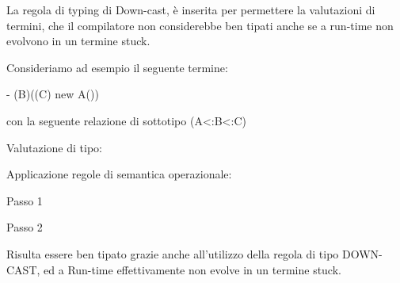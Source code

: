 La regola di typing di Down-cast, \`e inserita per permettere la valutazioni di termini, che il compilatore non considerebbe ben tipati anche se a run-time non evolvono in un termine stuck.

\vspace{0,5cm}
Consideriamo ad esempio il seguente termine: 

	- (B)((C) new A())
	
	con la seguente relazione di sottotipo (A<:B<:C)

\vspace{0,5cm}	
Valutazione di tipo:

\vspace{0,3cm}
\begin{prooftree}
	\end{prooftree}
	
\vspace{1cm}	
Applicazione regole di semantica operazionale:

\vspace{0,3cm}
Passo 1
\begin{prooftree}
	\end{prooftree}	

\vspace{0,3cm}
Passo 2

	\begin{prooftree}
	\end{prooftree}	

\vspace{0,5cm}
Risulta essere ben tipato grazie anche all'utilizzo della regola di tipo DOWN-CAST, ed a Run-time effettivamente non evolve in un termine stuck.




\vspace{1cm}			 
